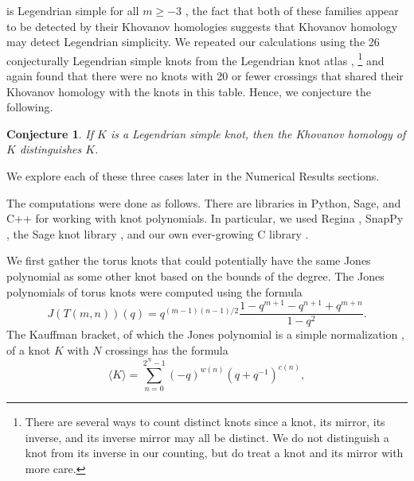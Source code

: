 \documentclass{article}
\theoremstyle{plain}
\newtheorem{conjecture}{Conjecture}
\begin{document}
        is Legendrian simple for all $m\geq{-3}$
        \cite{EtnyreEtAlLegendrianAndTransverseTwistKnots},
        the fact that both of these
        families appear to be detected by their Khovanov homologies suggests
        that Khovanov homology may detect Legendrian simplicity. We repeated
        our calculations using the 26 conjecturally Legendrian simple knots
        from the Legendrian knot atlas \cite{LegendrianKnotAtlas},%
        \footnote{%
            There are several ways to count distinct knots since a knot,
            its mirror, its inverse, and its inverse mirror may all be distinct.
            We do not distinguish a knot from its inverse in our counting,
            but do treat a knot and its mirror with more care.
        }
        and again found that there were no knots with 20 or fewer crossings
        that shared their Khovanov homology with the knots in this table.
        Hence, we conjecture the following.
        \begin{conjecture}
            If $K$ is a Legendrian simple knot,
            then the Khovanov homology of $K$ distinguishes $K$.
        \end{conjecture}
        We explore each of these three cases later in the Numerical Results
        sections.
        \par\hfill\par
        The computations were done as follows. There are libraries in Python,
        Sage, and C++ for working with knot polynomials. In particular, we used
        Regina \cite{regina}, SnapPy \cite{SnapPy}, the Sage knot library
        \cite{sage}, and our own ever-growing C library
        \cite{MaguireLibtmpl}.
        \par\hfill\par
        We first gather the torus knots that could potentially have the same
        Jones polynomial as some other knot based on the bounds of the degree.
        The Jones polynomials of torus knots were computed using the formula
        \cite{JonesJonesPolyForDummies}
        \begin{equation}
            \label{eqn:jones_poly_torus}%
            J(T(m,n))(q)=
            q
            ^{(m-1)(n-1)/2}
            \frac{1-q^{m+1}-q^{n+1}+q^{m+n}}{1-q^{2}}.
        \end{equation}
        The Kauffman bracket, of which the Jones polynomial is a simple
        normalization \cite{BarNatanKhovanovJones},
        of a knot $K$ with $N$ crossings has the formula
        \begin{equation}
            \langle{K}\rangle
            =
            \sum_{n=0}^{2^{N}-1}(-q)^{w(n)}(q+q^{-1})^{c(n)},
        \end{equation}
\end{document}
